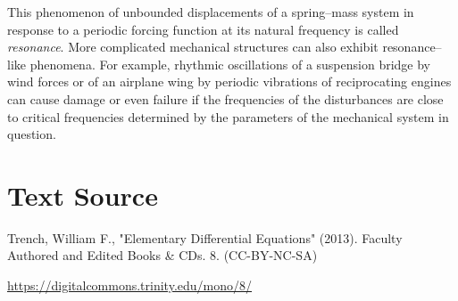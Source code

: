 \documentclass{ximera}
\begin{document}
 
 
This phenomenon of unbounded displacements of a spring--mass system in
response to a periodic forcing function at its natural
frequency is called \textit{resonance}. More complicated mechanical
structures can also exhibit resonance--like phenomena. For example,
rhythmic oscillations of a suspension bridge by wind forces or of an
airplane wing by periodic vibrations of reciprocating engines can
cause damage or even failure if the frequencies of the disturbances
are close to critical frequencies determined by the parameters of the
mechanical system in question.
 
\section*{Text Source}
Trench, William F., "Elementary Differential Equations" (2013). Faculty Authored and Edited Books \& CDs. 8. (CC-BY-NC-SA)
 
\href{https://digitalcommons.trinity.edu/mono/8/}{https://digitalcommons.trinity.edu/mono/8/}
 
\end{document}
